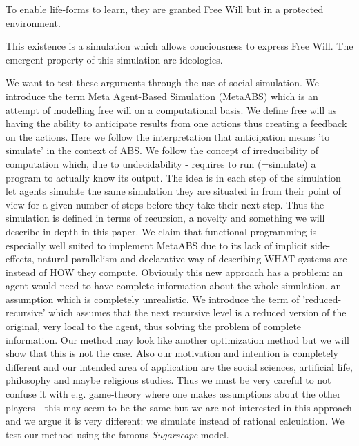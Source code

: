 \begin{theorem}
To enable life-forms to learn, they are granted Free Will but in a protected environment.
\end{theorem}

\begin{corollary}
This existence is a simulation which allows conciousness to express Free Will. The emergent property of this simulation are ideologies.
\end{corollary}


We want to test these arguments through the use of social simulation. We introduce the term Meta Agent-Based Simulation (MetaABS) which is an attempt of modelling free will on a computational basis. We define free will as having the ability to anticipate results from one actions thus creating a feedback on the actions. Here we follow the interpretation that anticipation means 'to simulate' in the context of ABS. We follow the concept of irreducibility of computation which, due to undecidability - requires to run (=simulate) a program to actually know its output. The idea is in each step of the simulation let agents simulate the same simulation they are situated in from their point of view for a given number of steps before they take their next step. Thus the simulation is defined in terms of recursion, a novelty and something we will describe in depth in this paper. We claim that functional programming is especially well suited to implement MetaABS due to its lack of implicit side-effects, natural parallelism and declarative way of describing WHAT systems are instead of HOW they compute. Obviously this new approach has a problem: an agent would need to have complete information about the whole simulation, an assumption which is completely unrealistic. We introduce the term of 'reduced-recursive' which assumes that the next recursive level is a reduced version of the original, very local to the agent, thus solving the problem of complete information. Our method may look like another optimization method but we will show that this is not the case. Also our motivation and intention is completely different and our intended area of application are the social sciences, artificial life, philosophy and maybe religious studies. Thus we must be very careful to not confuse it with e.g. game-theory where one makes assumptions about the other players - this may seem to be the same but we are not interested in this approach and we argue it is very different: we simulate instead of rational calculation. We test our method using the famous \textit{Sugarscape} model.

